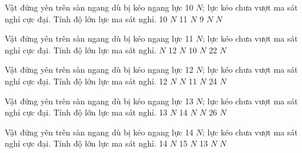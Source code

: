 \begin{ex}
Vật đứng yên trên sàn ngang dù bị kéo ngang lực 10 $N$; lực kéo chưa vượt ma sát nghỉ cực đại. Tính độ lớn lực ma sát nghỉ.
\choice
{10 $N$}
{11 $N$}
{9 $N$}
{ $N$}
\end{ex}

\begin{ex}
Vật đứng yên trên sàn ngang dù bị kéo ngang lực 11 $N$; lực kéo chưa vượt ma sát nghỉ cực đại. Tính độ lớn lực ma sát nghỉ.
\choice
{ $N$}
{12 $N$}
{10 $N$}
{22 $N$}
\end{ex}

\begin{ex}
Vật đứng yên trên sàn ngang dù bị kéo ngang lực 12 $N$; lực kéo chưa vượt ma sát nghỉ cực đại. Tính độ lớn lực ma sát nghỉ.
\choice
{12 $N$}
{ $N$}
{11 $N$}
{24 $N$}
\end{ex}

\begin{ex}
Vật đứng yên trên sàn ngang dù bị kéo ngang lực 13 $N$; lực kéo chưa vượt ma sát nghỉ cực đại. Tính độ lớn lực ma sát nghỉ.
\choice
{13 $N$}
{14 $N$}
{ $N$}
{26 $N$}
\end{ex}

\begin{ex}
Vật đứng yên trên sàn ngang dù bị kéo ngang lực 14 $N$; lực kéo chưa vượt ma sát nghỉ cực đại. Tính độ lớn lực ma sát nghỉ.
\choice
{14 $N$}
{15 $N$}
{13 $N$}
{ $N$}
\end{ex}


